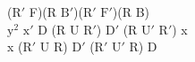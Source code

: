 ($\text{R}'$ F)(R $\text{B}'$)($\text{R}'$ $\text{F}'$)(R B)\\
$\text{y}^2$ $\text{x}'$ D (R U $\text{R}'$) $\text{D}'$ (R $\text{U}'$ $\text{R}'$) x\\
x ($\text{R}'$ U R) $\text{D}'$ ($\text{R}'$ $\text{U}'$ R) D\\
